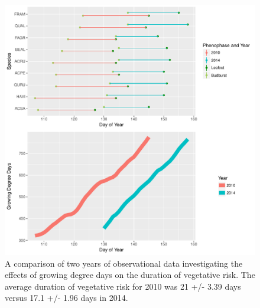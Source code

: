 \documentclass{article}\usepackage[]{graphicx}\usepackage[]{color}
\begin{document}
\begin{figure} [H] 
\begin{center}
\includegraphics{..//figure/HF_gddTime.pdf}
\caption{A comparison of two years of observational data investigating the effects of growing degree days on the duration of vegetative risk. The average duration of vegetative risk for 2010 was 21 +/- 3.39 days versus 17.1 +/- 1.96 days in 2014.}\label{fig:forest}
\end{center}
\end{figure}
\end{document}
